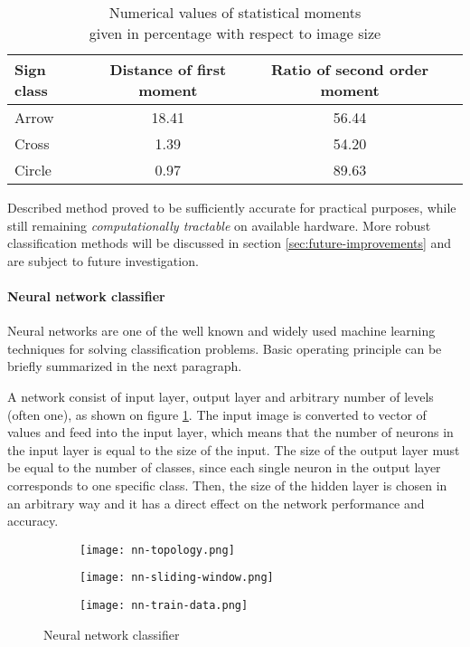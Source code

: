 \begin{table}[th!]
\centering
	\begin{tabular}{l*{2}{c}r}
		\toprule
		Sign class			& Distance of first moment & Ratio of second order moment  \\
		\hline
		Arrow 				& 18.41 & 56.44  \\
		Cross            	& 1.39 & 54.20  \\
		Circle           	& 0.97 & 89.63  \\
		\bottomrule
	\end{tabular}
\caption{Numerical values of statistical moments \\given in percentage with respect to image size}
\label{tab:moments}
\end{table}

Described method proved to be sufficiently accurate for practical purposes, while still remaining \textit{computationally tractable} on available hardware. More robust classification methods will be discussed in section \ref{sec:future-improvements} and are subject to future investigation.

\paragraph{Neural network classifier}


Neural networks are one of the well known and widely used machine learning techniques for solving classification problems. Basic operating principle can be briefly summarized in the next paragraph.

A network consist of input layer, output layer and arbitrary number of levels (often one), as shown on figure \ref{fig:nn-topology}. The input image is converted to vector of values and feed into the input layer, which means that the number of neurons in the input layer is equal to the size of the input. The size of the output layer must be equal to the number of classes, since each single neuron in the output layer corresponds to one specific class. Then, the size of the hidden layer is chosen in an arbitrary way and it has a direct effect on the network performance and accuracy.


\begin{figure}[th!]
	\centering
	\begin{subfigure}[b]{1\textwidth}
		\centering
		\texttt{[image: nn-topology.png]}
		\label{fig:nn-topology}
	\end{subfigure}
	\begin{subfigure}[b]{0.45\textwidth}
		\centering
		\texttt{[image: nn-sliding-window.png]}
		\label{fig:nn-sliding-window}
	\end{subfigure}
	\begin{subfigure}[b]{0.45\textwidth}
		\centering
		\texttt{[image: nn-train-data.png]}
		\label{fig:nn-train-data}
	\end{subfigure}
	\caption{Neural network classifier}
	\label{fig:nn-general}
\end{figure}

